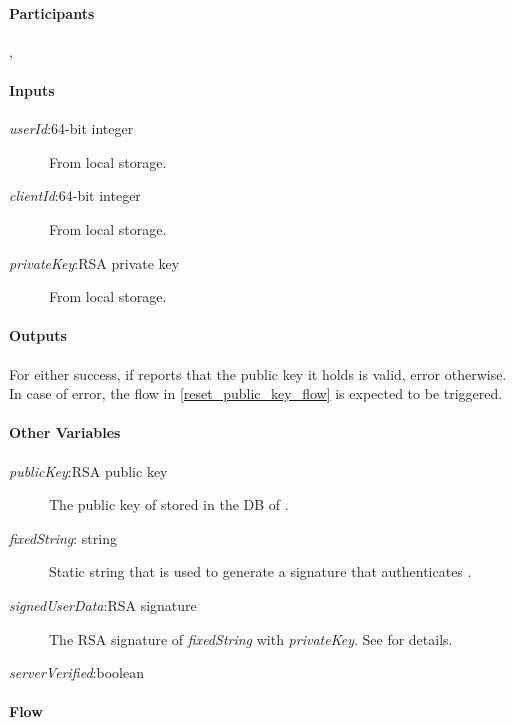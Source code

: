 \documentclass[a4paper,10pt,draft]{article}
\newcommand{\signedUserData}{\emph{signedUserData}}
\newcommand{\serverVerified}{\emph{serverVerified}}
\newcommand{\privateKey}{\emph{privateKey}}
\newcommand{\publicKey}{\emph{publicKey}}
\newcommand{\userId}{\emph{userId}}
\newcommand{\clientId}{\emph{clientId}}
\newcommand{\fixedString}{\emph{fixedString}}
\begin{document}
\paragraph{Participants} \Client{}, \Server{}

\paragraph{Inputs}
\SpecialItem
\begin{description}
 \item[\userId{}:64-bit integer] From \Client{} local storage.
 \item[\clientId{}:64-bit integer] From \Client{} local storage.
 \item[\privateKey{}:RSA private key] From \Client{} local storage.
\end{description}

\paragraph{Outputs}
For \Client{} either success, if \Server{} reports that the public key it holds 
is valid, error otherwise. In case of error, the flow 
in \ref{reset_public_key_flow} is expected to be triggered.

\paragraph{Other Variables}
\SpecialItem
\begin{description}
 \item[\publicKey{}:RSA public key] The public key of \Client{} stored in the 
DB of \Server{}.
 \item[\fixedString{}: string] Static string that is used to generate a 
signature that authenticates \Client{}.
 \item[\signedUserData{}:RSA signature] The RSA signature of \fixedString{}
with \privateKey{}. See \cite{crypto_spec} for details.
 \item[\serverVerified{}:boolean]
\end{description}

\paragraph{Flow}
\end{document}
